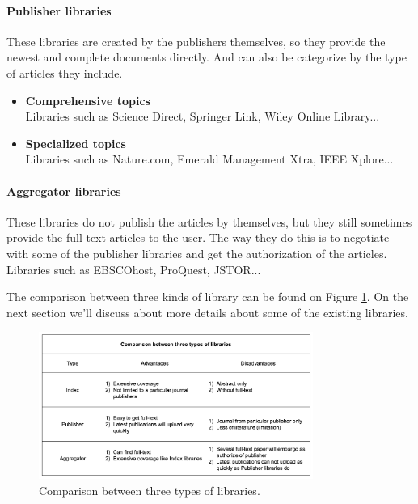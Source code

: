 \paragraph{Publisher libraries}

	These libraries are created by the publishers themselves, so they provide the newest and complete documents directly.
	And can also be categorize by the type of articles they include.
	
	\begin{itemize}
		
		\item\textbf{Comprehensive topics}\\Libraries such as Science Direct, Springer Link, Wiley Online Library...
		\item\textbf{Specialized topics}\\Libraries such as Nature.com, Emerald Management Xtra, IEEE Xplore...
		
	\end{itemize}
	
\paragraph{Aggregator libraries}

	These libraries do not publish the articles by themselves, but they still sometimes provide the full-text articles to the user.
	The way they do this is to negotiate with some of the publisher libraries and get the authorization of the articles.
	Libraries such as EBSCOhost, ProQuest, JSTOR...

The comparison between three kinds of library can be found on Figure \ref{WBC1}.
On the next section we'll discuss about more details about some of the existing libraries.

\begin{figure}[htb]
	\begin{center}
		\includegraphics[width=0.8\textwidth]{Wolverine_Background_Chart_1}
	\end{center}
	\caption{Comparison between three types of libraries.\label{WBC1}}
\end{figure}
\newpage

